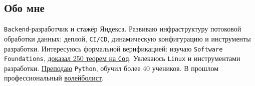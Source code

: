 \documentclass[margin,line]{resume}
\begin{document}
\begin{resume}

  \section{\mysidestyle Обо мне}
  \texttt{Backend}-разработчик и стажёр Яндекса. Развиваю инфраструктуру
  потоковой обработки данных: деплой, \texttt{CI/CD}, динамическую конфигурацию
  и инструменты разработки. Интересуюсь формальной верификацией: изучаю
  \texttt{Software Foundations},
  \href{https://github.com/alchemmist/coq-learning}{доказал 250 теорем на
  \texttt{Coq}}. Увлекаюсь \texttt{Linux} и инструментами разработки.
  \href{https://alchemmist.xyz/teach/individual-education/}{Преподаю} \texttt{Python}, обучил
  более 40 учеников. В прошлом профессиональный
  \href{https://alchemmist.github.io/CV/attachments/sport.pdf}{волейболист}.


\end{resume}
\end{document}
